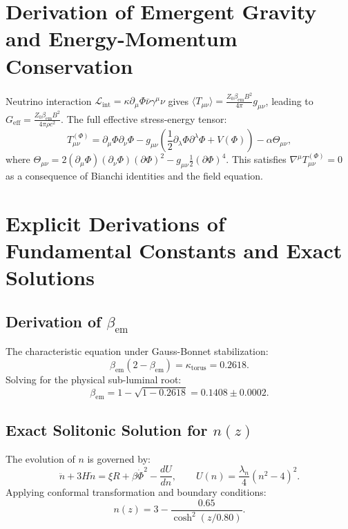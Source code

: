\documentclass[12pt, a4paper]{article}
\begin{document}
\section{Derivation of Emergent Gravity and Energy-Momentum Conservation}
\label{app:gravity}
Neutrino interaction $\mathcal{L}_{\mathrm{int}} = \kappa \partial_{\mu}\Phi \bar{\nu}\gamma^{\mu}\nu$ gives $\langle T_{\mu \nu}\rangle = \frac{Z_0\beta_{\mathrm{em}}B^2}{4\pi} g_{\mu \nu}$, leading to $G_{\mathrm{eff}} = \frac{Z_0\beta_{\mathrm{em}}B^2}{4\pi \rho c^2}$. The full effective stress-energy tensor:
\begin{equation}
T_{\mu \nu}^{(\Phi)} = \partial_{\mu}\Phi \partial_{\nu}\Phi -g_{\mu \nu}\left(\frac{1}{2}\partial_{\lambda}\Phi \partial^{\lambda}\Phi +V(\Phi)\right) - \alpha \Theta_{\mu \nu},
\end{equation}
where $\Theta_{\mu \nu} = 2(\partial_{\mu}\Phi)(\partial_{\nu}\Phi)(\partial \Phi)^2 - g_{\mu \nu}\frac{1}{2} (\partial \Phi)^4$. This satisfies $\nabla^{\mu}T_{\mu \nu}^{(\Phi)} = 0$ as a consequence of Bianchi identities and the field equation.

\section{Explicit Derivations of Fundamental Constants and Exact Solutions}
\subsection{Derivation of $\beta_{\mathrm{em}}$}
The characteristic equation under Gauss-Bonnet stabilization:
\begin{equation}
\beta_{\mathrm{em}}(2 - \beta_{\mathrm{em}}) = \kappa_{\mathrm{torus}} = 0.2618.
\end{equation}
Solving for the physical sub-luminal root:
\begin{equation}
\beta_{\mathrm{em}} = 1 - \sqrt{1 - 0.2618} = 0.1408\pm 0.0002.
\end{equation}

\subsection{Exact Solitonic Solution for $n(z)$}
The evolution of $n$ is governed by:
\begin{equation}
\ddot{n} + 3H\dot{n} = \xi R + \beta \dot{\Phi}^2 - \frac{dU}{dn}, \qquad U(n) = \frac{\lambda_n}{4} (n^2 - 4)^2.
\end{equation}
Applying conformal transformation and boundary conditions:
\begin{equation}
n(z) = 3 - \frac{0.65}{\cosh^2(z / 0.80)}.
\end{equation}
\end{document}

